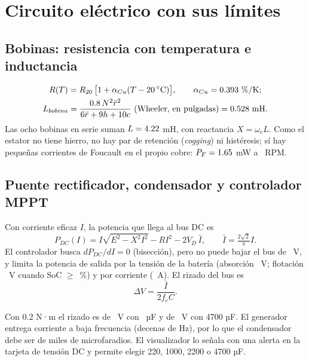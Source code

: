 \documentclass[11pt]{article}
\begin{document}
\section{Circuito eléctrico con sus límites}
\subsection{Bobinas: resistencia con temperatura e inductancia}
\begin{gather*}
  R(T)=R_{20}\,\big[1+\alpha_{Cu}(T-20\,^\circ\text{C})\big],\qquad \alpha_{Cu}=0.393\ \text{\%/K};\\
  L_{bobina}=\frac{0.8\,N^2\bar r^2}{6\bar r+9h+10c}\ \text{(Wheeler, en pulgadas)}=0.528\ \text{mH}.
\end{gather*}
Las ocho bobinas en serie suman $L=4.22$ mH, con reactancia $X=\omega_eL$. Como el estator
no tiene hierro, no hay par de retención (\emph{cogging}) ni histéresis; sí hay pequeñas corrientes de Foucault en
el propio cobre: $P_F=1.65$ mW a \ValRpmRegimenRef\ RPM.

\subsection{Puente rectificador, condensador y controlador MPPT}
Con corriente eficaz $I$, la potencia que llega al bus DC es
\[
  P_{DC}(I)=I\sqrt{E^2-X^2I^2}-RI^2-2V_D\,\bar I,\qquad \bar I=\tfrac{2\sqrt2}{\pi}I .
\]
El controlador busca $dP_{DC}/dI=0$ (bisección), pero no puede bajar el bus de \ValControladorArranque\ V, y
limita la potencia de salida por la tensión de la batería (absorción \ValControladorAbsorcion\ V; flotación
\ValControladorFlotacion\ V cuando SoC $\ge$ \ValBateriaSocFlotacion\,\%) y por corriente (\ValControladorCorrienteMax\ A).
El rizado del bus es
\[
  \Delta V=\frac{\bar I}{2f_eC}.
\]

\begin{advertencia}
Con 0.2 N·m el rizado es de \ValRizadoBajo\ V con \ValCapacitanciaMicro\ µF y de \ValRizadoAlto\ V con 4700 µF.
El generador entrega corriente a baja frecuencia (decenas de Hz), por lo que el condensador debe ser de
miles de microfaradios. El visualizador lo señala con una alerta en la tarjeta de tensión DC y permite elegir
220, 1000, 2200 o 4700 µF.
\end{advertencia}
\end{document}

